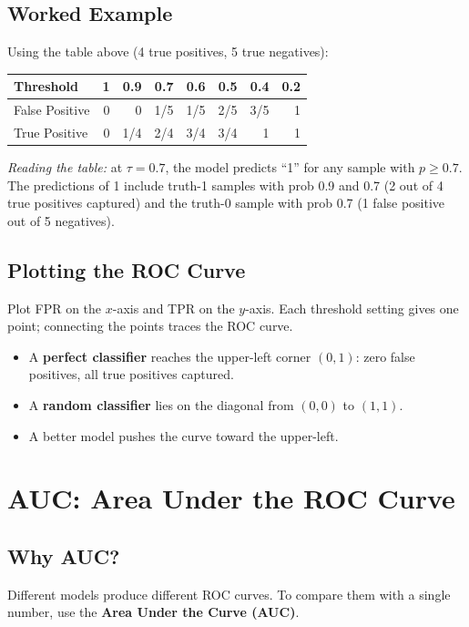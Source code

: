 \documentclass[11pt]{article}
\begin{document}
\subsection{Worked Example}
Using the table above (4 true positives, 5 true negatives):

\begin{center}
\begin{tabular}{@{}lrrrrrrr@{}}
\toprule
\textbf{Threshold} & \textbf{1} & \textbf{0.9} & \textbf{0.7}
  & \textbf{0.6} & \textbf{0.5} & \textbf{0.4} & \textbf{0.2} \\
\midrule
False Positive & 0     & 0     & 1/5   & 1/5   & 2/5   & 3/5   & 1 \\
True Positive  & 0     & 1/4   & 2/4   & 3/4   & 3/4   & 1     & 1 \\
\bottomrule
\end{tabular}
\end{center}

\textit{Reading the table:} at $\tau = 0.7$, the model predicts ``1'' for
any sample with $p \geq 0.7$. The predictions of 1 include truth-1 samples
with prob 0.9 and 0.7 (2 out of 4 true positives captured) and the
truth-0 sample with prob 0.7 (1 false positive out of 5 negatives).

\subsection{Plotting the ROC Curve}
Plot FPR on the $x$-axis and TPR on the $y$-axis. Each threshold setting
gives one point; connecting the points traces the ROC curve.
\begin{itemize}
    \item A \textbf{perfect classifier} reaches the upper-left corner
      $(0, 1)$: zero false positives, all true positives captured.
    \item A \textbf{random classifier} lies on the diagonal from $(0,0)$
      to $(1,1)$.
    \item A better model pushes the curve toward the upper-left.
\end{itemize}


\newpage
\section{AUC: Area Under the ROC Curve}

\subsection{Why AUC?}
Different models produce different ROC curves. To compare them with a
single number, use the \textbf{Area Under the Curve (AUC)}.
\end{document}
